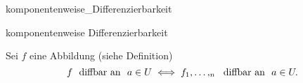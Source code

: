 \documentclass[class=article, crop=false]{standalone}
\begin{document}
\begin{zettel}{komponentenweise_Differenzierbarkeit}
\begin{flashcard}[rk4gcn4s]{komponentenweise Differenzierbarkeit}
	\begin{lemma}
		Sei $f$ eine Abbildung (siehe Definition)
		\[
			f \tx{ diffbar an } a \in  U \iff f_1,\dots,_n \tx{ diffbar an  } a \in  U
		.\]
	\end{lemma}

\end{flashcard}
\end{zettel}
\end{document}

